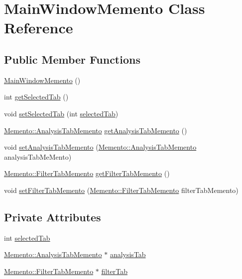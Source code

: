 \hypertarget{classMemento_1_1MainWindowMemento}{}\section{Main\+Window\+Memento Class Reference}
\label{classMemento_1_1MainWindowMemento}
\subsection*{Public Member Functions}
\begin{DoxyCompactItemize}
\item 
\hyperlink{classMemento_1_1MainWindowMemento_a2ce9d23f57fc6397812a080c3111d56c}{Main\+Window\+Memento} ()
\item 
int \hyperlink{classMemento_1_1MainWindowMemento_a876003270f9665415d49783d0669511a}{get\+Selected\+Tab} ()
\item 
void \hyperlink{classMemento_1_1MainWindowMemento_a9ec6af835d6fdbf10eb8a6db5ad59578}{set\+Selected\+Tab} (int \hyperlink{classMemento_1_1MainWindowMemento_aa1aed58bddd5b90f62a2516015ab3c04}{selected\+Tab})
\item 
\hyperlink{classMemento_1_1AnalysisTabMemento}{Memento\+::\+Analysis\+Tab\+Memento} \hyperlink{classMemento_1_1MainWindowMemento_aeaae363ca3c1aaa02d9acd9fbcd669e5}{get\+Analysis\+Tab\+Memento} ()
\item 
void \hyperlink{classMemento_1_1MainWindowMemento_a2f3cbb73b8364dfb6640b0e5225600cf}{set\+Analysis\+Tab\+Memento} (\hyperlink{classMemento_1_1AnalysisTabMemento}{Memento\+::\+Analysis\+Tab\+Memento} analysis\+Tab\+Me\+Mento)
\item 
\hyperlink{classMemento_1_1FilterTabMemento}{Memento\+::\+Filter\+Tab\+Memento} \hyperlink{classMemento_1_1MainWindowMemento_aca564eecb180bc19d899b14c9ebe5486}{get\+Filter\+Tab\+Memento} ()
\item 
void \hyperlink{classMemento_1_1MainWindowMemento_aabc5961524bfb567d2f7f5bdf79e6661}{set\+Filter\+Tab\+Memento} (\hyperlink{classMemento_1_1FilterTabMemento}{Memento\+::\+Filter\+Tab\+Memento} filter\+Tab\+Memento)
\end{DoxyCompactItemize}
\subsection*{Private Attributes}
\begin{DoxyCompactItemize}
\item 
int \hyperlink{classMemento_1_1MainWindowMemento_aa1aed58bddd5b90f62a2516015ab3c04}{selected\+Tab}
\item 
\hyperlink{classMemento_1_1AnalysisTabMemento}{Memento\+::\+Analysis\+Tab\+Memento} $\ast$ \hyperlink{classMemento_1_1MainWindowMemento_a706b928eccc0de3d1175f53e3bf6e391}{analysis\+Tab}
\item 
\hyperlink{classMemento_1_1FilterTabMemento}{Memento\+::\+Filter\+Tab\+Memento} $\ast$ \hyperlink{classMemento_1_1MainWindowMemento_aa834b7b9b12f3913750cd558db4b7796}{filter\+Tab}
\end{DoxyCompactItemize}



